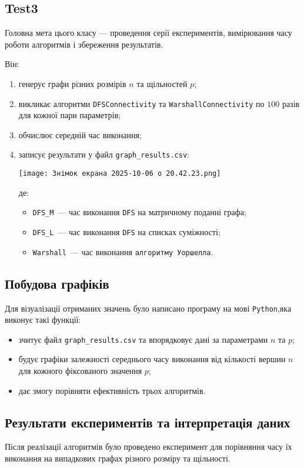 \documentclass[12pt,a4paper]{article}
\begin{document}
\subsection{Test3}
Головна мета цього класу — проведення серії експериментів, 
вимірювання часу роботи алгоритмів і збереження результатів. 

Він:
\begin{enumerate}
    \item генерує графи різних розмірів $n$ та щільностей $p$;
    \item викликає алгоритми \texttt{DFSConnectivity} та \texttt{WarshallConnectivity}
    по $100$ разів для кожної пари параметрів;
    \item обчислює середній час виконання;
    \item записує результати у файл \texttt{graph\_results.csv}:
\begin{center}
\texttt{[image: Знімок екрана 2025-10-06 о 20.42.23.png]}
\label{fig:results-table}
\end{center}
де:
\begin{itemize}
    \item \texttt{DFS\_M}~--- час виконання \texttt{DFS} на матричному поданні графа;
    \item \texttt{DFS\_L}~--- час виконання \texttt{DFS} на списках суміжності;
    \item \texttt{Warshall}~--- час виконання \texttt{алгоритму Уоршелла}.
\end{itemize}
\end{enumerate}
\subsection{Побудова графіків}
Для візуалізації отриманих значень було написано програму на мові \texttt{Python},яка виконує такі функції:
\begin{itemize}
    \item зчитує файл \texttt{graph\_results.csv} та впорядковує дані за параметрами $n$ та $p$;
    \item будує графіки залежності середнього часу виконання від кількості вершин $n$ 
    для кожного фіксованого значення $p$;
    \item дає змогу порівняти ефективність трьох алгоритмів.
\end{itemize}
\subsection{Результати експериментів та інтерпретація даних}
Після реалізації алгоритмів було проведено експеримент для порівняння часу їх виконання 
на випадкових графах різного розміру та щільності.  
\end{document}
